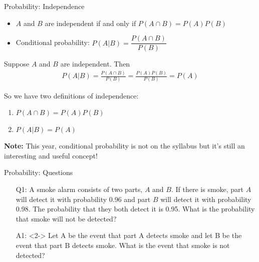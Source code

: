 \documentclass[10pt, handout, xcolor=table]{beamer}
\begin{document}
\begin{frame}{Probability: Independence}
\pause
\begin{itemize}
  \setlength{\itemsep}{15pt}
\item $A$ and $B$ are independent if and only if $P(A \cap B) = P(A)P(B)$
\item Conditional probability: $P(A|B) = \dfrac{P(A \cap B)}{P(B)}$
\end{itemize}

Suppose $A$ and $B$ are independent. Then
\begin{align*}
P(A|B) = \frac{P(A \cap B)}{P(B)} = \frac{P(A) P(B)}{P(B)} = P(A)
\end{align*}

So we have two definitions of independence:
\begin{enumerate}
\item $P(A \cap B) = P(A)P(B)$
\item $P(A|B) = P(A)$
\end{enumerate}

\textbf{Note:} This year, conditional probability is not on the syllabus but it's still an interesting and useful concept!
\end{frame}

\begin{frame}{Probability: Questions}
\begin{itemize}
  \setlength{\itemsep}{15pt}
\item[Q1:] A smoke alarm consists of two parts, $A$ and $B$. If there is smoke, part $A$ will detect it with probability 0.96 and part $B$ will detect it with probability 0.98. The probability that they both detect it is 0.95. What is the probability that smoke will not be detected?
\item[A1:]<2-> \color{red}
Let A be the event that part A detects smoke and let B be the event that part B detects smoke. What is the event that smoke is not detected?\\
\medskip
{}
\end{itemize}
\end{frame}
\end{document}
